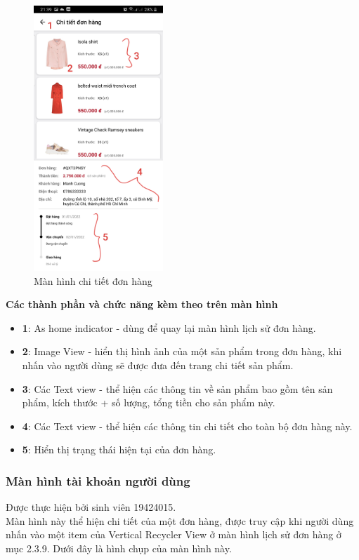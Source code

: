 \documentclass[12pt]{article}
\begin{document}
\begin{figure}[H]
    \centering
    \includegraphics[height=10cm]{images/37.png}
    \caption{Màn hình chi tiết đơn hàng}
\end{figure}

\indent \textbf{Các thành phần và chức năng kèm theo trên màn hình}
\begin{itemize}
    \item \textbf{1}: As home indicator - dùng để quay lại màn hình lịch sử đơn hàng.
    \item \textbf{2}: Image View - hiển thị hình ảnh của một sản phẩm trong đơn hàng, khi nhấn vào người dùng sẽ được đưa đến trang chi tiết sản phẩm.
    \item \textbf{3}: Các Text view - thể hiện các thông tin về sản phẩm bao gồm tên sản phẩm, kích thước + số lượng, tổng tiền cho sản phẩm này.
    \item \textbf{4}: Các Text view - thể hiện các thông tin chi tiết cho toàn bộ đơn hàng này.
    \item \textbf{5}: Hiển thị trạng thái hiện tại của đơn hàng.
\end{itemize}

\subsubsection{Màn hình tài khoản người dùng}
Được thực hiện bởi sinh viên 19424015.\\

\indent Màn hình này thể hiện chi tiết của một đơn hàng, được truy cập khi người dùng nhấn vào một item của Vertical Recycler View ở màn hình lịch sử đơn hàng ở mục 2.3.9. Dưới đây là hình chụp của màn hình này.
\end{document}
